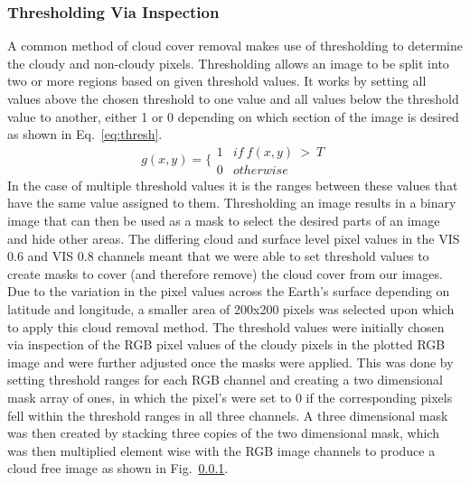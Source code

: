 \subsubsection{Thresholding Via Inspection}
 A common method of cloud cover removal makes use of thresholding to determine the cloudy and non-cloudy pixels. Thresholding allows an image to be split into two or more regions based on given threshold values. It works by setting all values above the chosen threshold to one value and all values below the threshold value to another, either 1 or 0 depending on which section of the image is desired as shown in Eq.~\ref{eq:thresh}.
 \begin{equation}\label{eq:thresh}
     g(x,y)=\Big\{\begin{matrix}
1 & if~f(x,y)~>~ T\\
0 & otherwise
\end{matrix}
 \end{equation}
 In the case of multiple threshold values it is the ranges between these values that have the same value assigned to them. Thresholding an image results in a binary image that can then be used as a mask to select the desired parts of an image and hide other areas. The differing cloud and surface level pixel values in the VIS 0.6 and VIS 0.8 channels meant that we were able to set threshold values to create masks to cover (and therefore remove) the cloud cover from our images. Due to the variation in the pixel values across the Earth's surface depending on latitude and longitude, a smaller area of 200x200 pixels was selected upon which to apply this cloud removal method. The threshold values were initially chosen via inspection of the RGB pixel values of the cloudy pixels in the plotted RGB image and were further adjusted once the masks were applied. This was done by setting threshold ranges for each RGB channel and creating a two dimensional mask array of ones,  in which the pixel's were set to 0 if the corresponding pixels fell within the threshold ranges in all three channels. A three dimensional mask was then created by stacking three copies of the two dimensional mask, which was then multiplied element wise with the RGB image channels to produce a cloud free image as shown in Fig.~\ref{}. 
 
